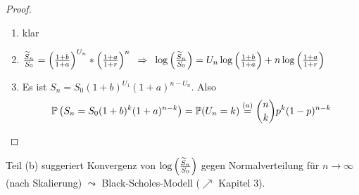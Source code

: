 \begin{proof}
	\begin{enumerate}[label=(zu \alph*), leftmargin=\zulength]
		\item klar
		\item $\frac{\widetilde{S}_n}{S_0} = \left( \frac{1+b}{1+a} \right)^{U_n} * \left( \frac{1+a}{1+r} \right)^n \enskip \Rightarrow \enskip \log\left( \frac{\widetilde{S}_n}{S_0} \right) = U_n \log\left( \frac{1+b}{1+a} \right) + n \log\left( \frac{1+a}{1+r} \right)$
		\item Es ist $S_n = S_0 (1+b)^{U_1}(1+a)^{n-U_n} $. Also
		\begin{equation*}
			\mathbb{P}\left( S_n = S_0 (1+b)^k (1+a)^{n-k} \right) = \mathbb{P}(U_n = k) \overset{(a)}{=} \binom{n}{k} p^k (1-p)^{n-k}
		\end{equation*}
	\end{enumerate}
\end{proof}

\begin{*bemerkung_inline}
	Teil (b) suggeriert Konvergenz von $\log\left( \frac{\widetilde{S}_n}{S_0} \right)$ gegen Normalverteilung für $n \to \infty$ (nach Skalierung) 
	$\leadsto$ Black-Scholes-Modell ($\nearrow$ Kapitel 3).
\end{*bemerkung_inline}